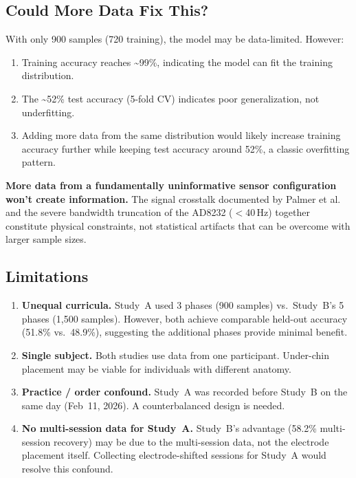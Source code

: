 \documentclass{article}
\begin{document}
\subsection{Could More Data Fix This?}

With only 900 samples (720 training), the model may be data-limited. However:
\begin{enumerate}
    \item Training accuracy reaches \textasciitilde99\%, indicating the model can fit the training distribution.
    \item The \textasciitilde52\% test accuracy (5-fold CV) indicates poor generalization, not underfitting.
    \item Adding more data from the same distribution would likely increase training accuracy further while keeping test accuracy around 52\%, a classic overfitting pattern.
\end{enumerate}

\textbf{More data from a fundamentally uninformative sensor configuration won't create information.} The signal crosstalk documented by Palmer et al.~\cite{palmer1999} and the severe bandwidth truncation of the AD8232 ($<$40\,Hz) together constitute physical constraints, not statistical artifacts that can be overcome with larger sample sizes.

\subsection{Limitations}
\label{sec:limitations}

\begin{enumerate}
    \item \textbf{Unequal curricula.} Study~A used 3 phases (900 samples) vs.\ Study~B's 5 phases (1{,}500 samples). However, both achieve comparable held-out accuracy (51.8\% vs.\ 48.9\%), suggesting the additional phases provide minimal benefit.

    \item \textbf{Single subject.} Both studies use data from one participant. Under-chin placement may be viable for individuals with different anatomy.

    \item \textbf{Practice / order confound.} Study~A was recorded before Study~B on the same day (Feb~11, 2026). A counterbalanced design is needed.

    \item \textbf{No multi-session data for Study~A.} Study~B's advantage (58.2\% multi-session recovery) may be due to the multi-session data, not the electrode placement itself. Collecting electrode-shifted sessions for Study~A would resolve this confound.
\end{enumerate}
\end{document}
